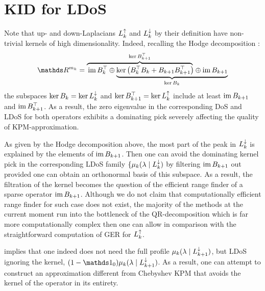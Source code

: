 \chapter{ KID for LDoS }
%
%

Note that up- and down-Laplacians \( L_{k}^{\uparrow} \) and \( L_{k}^{\downarrow} \) by their definition have non-trivial kernels of high dimensionality. Indeed, recalling the Hodge decomposition :
\begin{equation}
      \ds R^{m_k} = \lefteqn{\overbrace{\phantom{\im B_k^\top \oplus  \ker \left( B_k^\top B_k + B_{k+1} B_{k+1}^\top \right)}}^{\ker B_{k+1}^\top}} \im B_k^\top \oplus
      \underbrace{\ker \left( B_k^\top B_k + B_{k+1} B_{k+1}^\top \right) \oplus  \im B_{k+1}}_{\ker B_k}            
\end{equation}
the subspaces \( \ker B_k = \ker L_{k}^{\downarrow} \) and \( \ker B_{k+1}^\top = \ker L_{k}^{\uparrow} \) include at least \( \operatorname{im} B_{k+1}\) and \( \operatorname{im} B_{k+1}^\top \). As a result, the zero eigenvalue in the corresponding DoS and LDoS for both operators exhibits a dominating pick severely affecting the quality of KPM-approximation.

\begin{remark}
      As given by the Hodge decomposition above, the most part of the peak in \( L_{k}^{\downarrow} \) is explained by the elements of \( \operatorname{im} B_{k+1}\). Then one can avoid the dominating kernel pick in the corresponding LDoS family \( \{ \mu_k( \lambda \mid L_{k}^{\downarrow} ) \) by filtering \( \operatorname{im} B_{k+1}\) out provided one can obtain an orthonormal basis of this subspace. As a result, the filtration of the kernel becomes the question of the efficient range finder of a sparse operator \( \operatorname{im} B_{k+1} \). Although we do not claim that computationally efficient range finder for such case does not exist, the majority of the methods at the current moment run into the bottleneck of the QR-decomposition which is far more computationally complex then one can allow in comparison with the straightforward computation of GER for \( L_{k}^{\uparrow} \).
\end{remark}

 implies that one indeed does not need the full profile \( \mu_k(\lambda \mid L_{k+1}^{\downarrow} ) \), but LDoS ignoring the kernel, \( (1 - \ds 1_{0}) \mu_k(\lambda \mid \Ld {k+1} )  \).
As a result, one can attempt to construct an approximation different from Chebyshev KPM that avoids the kernel of the operator in its entirety.

